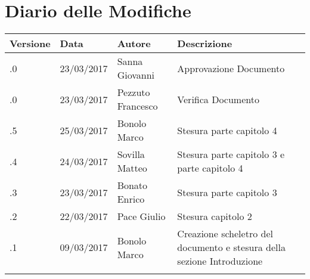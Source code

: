 \section*{Diario delle Modifiche}
\begin{longtabu} to \textwidth {
	X[4,l,p]
	X[4,l,p]
	X[4,l,p]
	X[8,l,p]}
	\toprule
		 Versione & Data & Autore & Descrizione \\
		\midrule
		\endhead
		\addlinespace[0.2em]
		\midrule
		.0 & 23/03/2017 & Sanna Giovanni & Approvazione Documento\\
		\addlinespace[0.2em]
		\midrule
		.0 & 23/03/2017 & Pezzuto Francesco & Verifica Documento\\
		\addlinespace[0.2em]
		\midrule
		.5 & 25/03/2017 & Bonolo Marco & Stesura parte capitolo 4\\
		\addlinespace[0.2em]
		\midrule
		.4 & 24/03/2017 & Sovilla Matteo & Stesura parte capitolo 3 e parte capitolo 4\\
		\addlinespace[0.2em]
		\midrule
		.3 & 23/03/2017 & Bonato Enrico & Stesura parte capitolo 3\\
		\addlinespace[0.2em]
		\midrule
		.2 & 22/03/2017 & Pace Giulio & Stesura capitolo 2\\
		\addlinespace[0.2em]
		\midrule
		.1 & 09/03/2017 & Bonolo Marco & Creazione scheletro del documento e stesura della sezione Introduzione\\
		\addlinespace[0.4em]
		
	\bottomrule
\end{longtabu}